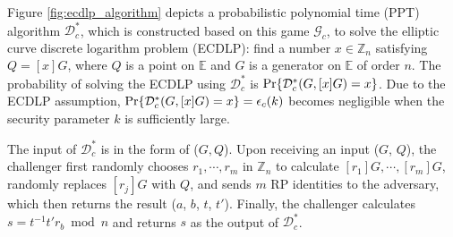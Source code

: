 Figure \ref{fig:ecdlp_algorithm} depicts a probabilistic polynomial time (PPT) algorithm $\mathcal{D}^*_c$, which is constructed based on this game $\mathcal{G}_c$, to solve the elliptic curve discrete logarithm problem (ECDLP): find a number $x \in \mathbb{Z}_n$ satisfying $Q = [x]G$,
where $Q$ is a point on $\mathbb{E}$ and $G$ is a generator on $\mathbb{E}$ of order $n$.
The probability of solving the ECDLP using $\mathcal{D}^*_c$ is ${\rm Pr}\{\mathcal{D}^*_c(G, [x]G)=x\}$.
Due to the ECDLP assumption,
    ${\rm Pr}\{\mathcal{D}^*_c(G, [x]G)=x\} = \epsilon_{c}(k)$ becomes negligible when the security parameter $k$ is sufficiently large.



The input of $\mathcal{D}^*_c$ is in the form of ($G, Q$). Upon receiving an input ($G$, $Q$), the challenger first randomly chooses $r_1, \cdots, r_m$ in $\mathbb{Z}_n$ to calculate $[r_1]G, \cdots, [r_m]G$, randomly replaces $[r_j]G$ with $Q$, and sends $m$ RP identities to the adversary, which then returns the result ($a$, $b$, $t$, $t'$). Finally, the challenger calculates $s = t^{-1}t'r_b \bmod n$ and returns $s$ as the output of $\mathcal{D}^*_c$.

